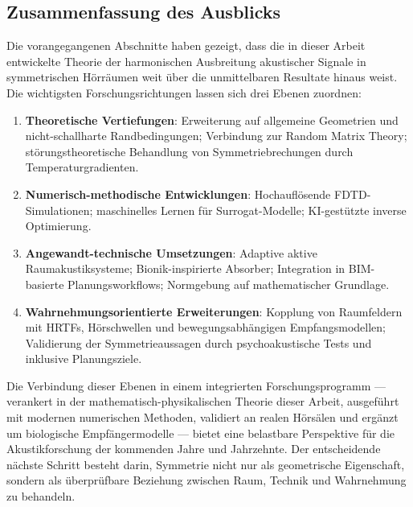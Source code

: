 ﻿\documentclass[12pt, a4paper]{article}
\theoremstyle{definition}
\theoremstyle{remark}
\begin{document}
\subsection{Zusammenfassung des Ausblicks}

Die vorangegangenen Abschnitte haben gezeigt, dass die in dieser Arbeit
entwickelte Theorie der harmonischen Ausbreitung akustischer Signale
in symmetrischen Hörräumen weit über die unmittelbaren Resultate hinaus
weist. Die wichtigsten Forschungsrichtungen lassen sich drei Ebenen zuordnen:

\begin{enumerate}
\item \textbf{Theoretische Vertiefungen}: Erweiterung auf allgemeine
  Geometrien und nicht-schallharte Randbedingungen; Verbindung zur
  Random Matrix Theory; störungstheoretische Behandlung von
  Symmetriebrechungen durch Temperaturgradienten.

\item \textbf{Numerisch-methodische Entwicklungen}: Hochauflösende
  FDTD-Simulationen; maschinelles Lernen für Surrogat-Modelle;
  KI-gestützte inverse Optimierung.

\item \textbf{Angewandt-technische Umsetzungen}: Adaptive aktive
  Raumakustiksysteme; Bionik-inspirierte Absorber; Integration
  in BIM-basierte Planungsworkflows; Normgebung auf mathematischer
  Grundlage.

\item \textbf{Wahrnehmungsorientierte Erweiterungen}: Kopplung von Raumfeldern mit
  HRTFs, Hörschwellen und bewegungsabhängigen Empfangsmodellen; Validierung der
  Symmetrieaussagen durch psychoakustische Tests und inklusive Planungsziele.
\end{enumerate}

Die Verbindung dieser Ebenen in einem integrierten Forschungsprogramm --- verankert
in der mathematisch-physikalischen Theorie dieser Arbeit, ausgeführt mit modernen
numerischen Methoden, validiert an realen Hörsälen und ergänzt um biologische
Empfängermodelle --- bietet eine belastbare Perspektive für die Akustikforschung der
kommenden Jahre und Jahrzehnte. Der entscheidende nächste Schritt besteht darin,
Symmetrie nicht nur als geometrische Eigenschaft, sondern als überprüfbare Beziehung
zwischen Raum, Technik und Wahrnehmung zu behandeln.


\end{document}
